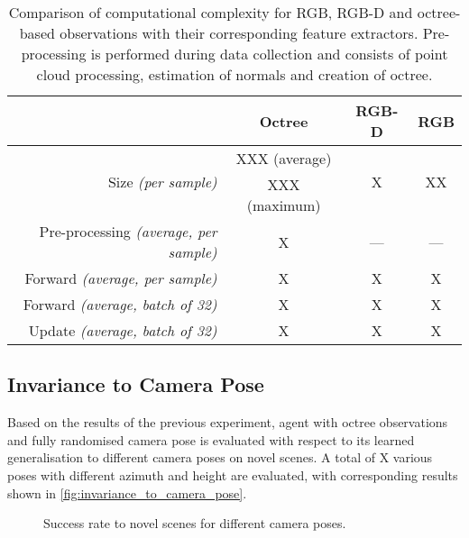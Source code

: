 \begin{table}[ht]
    \centering
    \begin{tabular}{r|ccc}
                                                      &
        \textbf{Octree}                               & \textbf{RGB-D} & \textbf{RGB}                             \\ \hline
        \multirow{2}{*}{Size \textit{(per sample)}}   & XXX (average)  & \multirow{2}{*}{X} & \multirow{2}{*}{XX} \\
                                                      & XXX (maximum)  &                    &                     \\[1mm]
        Pre-processing \textit{(average, per sample)} & X              & ---                & ---                 \\
        Forward \textit{(average, per sample)}        & X              & X                  & X                   \\
        Forward \textit{(average, batch of 32)}       & X              & X                  & X                   \\
        Update \textit{(average, batch of 32)}        & X              & X                  & X
    \end{tabular}
    \caption{Comparison of computational complexity for RGB, RGB-D and octree-based observations with their corresponding feature extractors. Pre-processing is performed during data collection and consists of point cloud processing, estimation of normals and creation of octree.}
    \label{tab:feature_extractor_memory_and_computational_time}
\end{table}


\subsection{Invariance to Camera Pose}

Based on the results of the previous experiment, agent with octree observations and fully randomised camera pose is evaluated with respect to its learned generalisation to different camera poses on novel scenes. A total of X various poses with different azimuth and height are evaluated, with corresponding results shown in \autoref{fig:invariance_to_camera_pose}.

\begin{figure}[ht]
    \centering
    \caption{Success rate to novel scenes for different camera poses.}
    \label{fig:invariance_to_camera_pose}
\end{figure}


